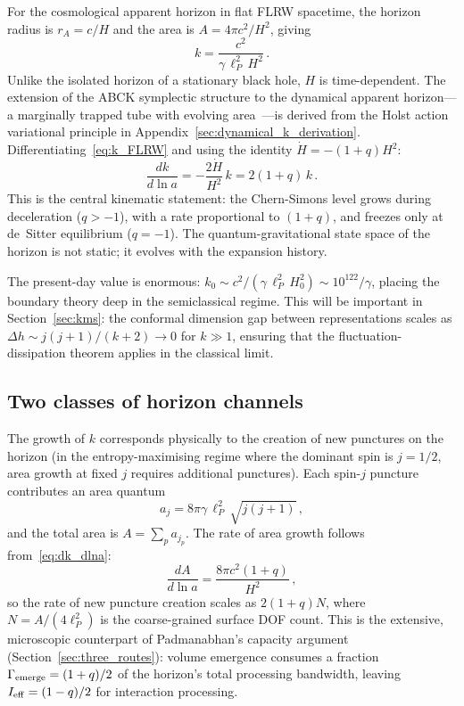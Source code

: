 \documentclass[aps,prd,twocolumn,10pt,superscriptaddress,nofootinbib]{revtex4-2}
\begin{document}
For the cosmological apparent horizon in flat FLRW spacetime, the
horizon radius is $r_A = c/H$ and the area is $A = 4\pi c^2/H^2$,
giving
\begin{equation}
k = \frac{c^2}{\gamma\,\ell_P^2\,H^2}\,.
\label{eq:k_FLRW}
\end{equation}
Unlike the isolated horizon of a stationary black hole, $H$ is
time-dependent.  The extension of the ABCK symplectic structure to
the dynamical apparent horizon---a marginally trapped tube with
evolving area~\cite{AshtekarKrishnan2003}---is derived from the
Holst action~\cite{Holst1996} variational principle in
Appendix~\ref{sec:dynamical_k_derivation}.
Differentiating~\eqref{eq:k_FLRW} and using the identity
$\dot{H} = -(1+q)H^2$:
\begin{equation}
\frac{dk}{d\ln a} = -\frac{2\dot{H}}{H^2}\,k = 2(1+q)\,k\,.
\label{eq:dk_dlna}
\end{equation}
This is the central kinematic statement: the Chern-Simons level
grows during deceleration ($q > -1$), with a rate proportional to
$(1+q)$, and freezes only at de~Sitter equilibrium ($q = -1$).
The quantum-gravitational state space of the horizon is not static;
it evolves with the expansion history.

The present-day value is enormous:
$k_0 \sim c^2/(\gamma\,\ell_P^2\,H_0^2) \sim 10^{122}/\gamma$,
placing the boundary theory deep in the semiclassical regime.  This
will be important in Section~\ref{sec:kms}: the conformal dimension
gap between representations scales as
$\Delta h \sim j(j+1)/(k+2) \to 0$ for $k \gg 1$, ensuring that
the fluctuation-dissipation theorem applies in the classical limit.


\subsection{Two classes of horizon channels}
\label{sec:two_channels}

The growth of $k$ corresponds physically to the creation of new
punctures on the horizon (in the entropy-maximising regime where
the dominant spin is $j = 1/2$, area growth at fixed $j$ requires
additional punctures).  Each spin-$j$ puncture contributes an
area quantum
\begin{equation}
a_j = 8\pi\gamma\,\ell_P^2\,\sqrt{j(j+1)}\,,
\label{eq:area_quantum}
\end{equation}
and the total area is $A = \sum_p a_{j_p}$.  The rate of area
growth follows from~\eqref{eq:dk_dlna}:
\begin{equation}
\frac{dA}{d\ln a} = \frac{8\pi c^2(1+q)}{H^2}\,,
\label{eq:dA_dlna}
\end{equation}
so the rate of new puncture creation scales as $2(1+q)N$, where
$N = A/(4\ell_P^2)$ is the coarse-grained surface DOF count.  This is the
extensive, microscopic counterpart of Padmanabhan's capacity
argument (Section~\ref{sec:three_routes}): volume emergence
consumes a fraction $\Gamma_{\rm emerge} = (1+q)/2$ of the
horizon's total processing bandwidth, leaving
$I_{\rm eff} = (1-q)/2$ for interaction processing.
\end{document}
